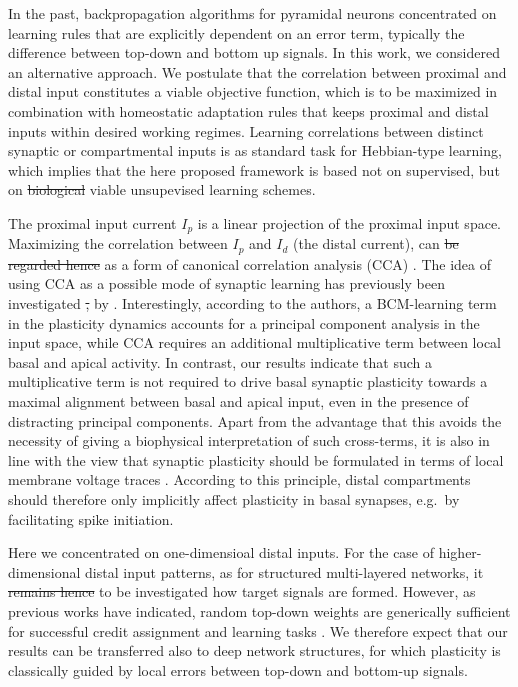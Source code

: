 \documentclass[utf8]{frontiersSCNS} %
\providecommand{\DIFaddtex}[1]{{\protect\color{blue}\uwave{#1}}} %
\providecommand{\DIFdeltex}[1]{{\protect\color{red}\sout{#1}}}                      %
\providecommand{\DIFaddbegin}{} %
\providecommand{\DIFaddend}{} %
\providecommand{\DIFdelbegin}{} %
\providecommand{\DIFdelend}{} %
\providecommand{\DIFadd}[1]{\texorpdfstring{\DIFaddtex{#1}}{#1}} %
\providecommand{\DIFdel}[1]{\texorpdfstring{\DIFdeltex{#1}}{}} %
\begin{document}
In the past, backpropagation algorithms 
for pyramidal neurons concentrated on 
learning rules that are explicitly dependent 
on an error term, typically the difference 
between top-down and bottom up signals.
In this work, we considered an alternative 
approach. We postulate that the correlation 
between proximal and distal input constitutes
a viable objective function, which is to be
maximized in combination with homeostatic 
adaptation rules that keeps proximal and 
distal inputs within desired working regimes.
Learning correlations between distinct
synaptic or compartmental inputs is
as standard task for Hebbian-type learning,
which implies that the here proposed framework
is based not on supervised, but on \DIFdelbegin \DIFdel{biological
}\DIFdelend \DIFaddbegin \DIFadd{biologically
}\DIFaddend viable unsupevised learning schemes.

The proximal input current $I_p$ is a linear 
projection of the proximal input space. 
Maximizing the correlation between $I_p$ and 
$I_d$ (the distal current), can \DIFdelbegin \DIFdel{be regarded 
hence }\DIFdelend \DIFaddbegin \DIFadd{therefore be regarded 
}\DIFaddend as a form of canonical correlation
analysis (CCA) \citep{Haerdle2007}. The idea 
of using CCA as a possible mode of 
synaptic learning has previously been investigated
\DIFdelbegin \DIFdel{,
}\DIFdelend by \citet{Haga2018}. Interestingly, according to 
the authors, a BCM-learning term in the plasticity 
dynamics accounts for a principal component analysis 
in the input space, while CCA requires an additional 
multiplicative term between local basal and apical 
activity. In contrast, our results indicate that 
such a multiplicative term is not required to drive 
basal synaptic plasticity towards a maximal alignment 
between basal and apical input, even in the presence 
of distracting principal components.
Apart from the advantage that this avoids the necessity 
of giving a biophysical interpretation of such cross-terms, 
it is also in line with the view that synaptic plasticity 
should be formulated in terms of local membrane voltage 
traces \citep{Clopath2010,Weissenberger2018}. 
According to this principle, distal compartments should 
therefore only implicitly affect plasticity in basal 
synapses, e.g.\ by facilitating spike initiation.

Here we concentrated on one-dimensioal distal inputs.
For the case of higher-dimensional distal input 
patterns, as for structured multi-layered networks,
it \DIFdelbegin \DIFdel{remains hence }\DIFdelend \DIFaddbegin \DIFadd{thus remains }\DIFaddend to be investigated how target signals 
are formed. However, as previous works have indicated, 
random top-down weights are generically sufficient 
for successful credit assignment and learning tasks
\citep{Lillicrap2016,Guerguiev2017}.
We therefore expect that our results can be
transferred also to deep network structures, 
for which plasticity is classically guided 
by local errors between top-down and bottom-up signals.
\end{document}

